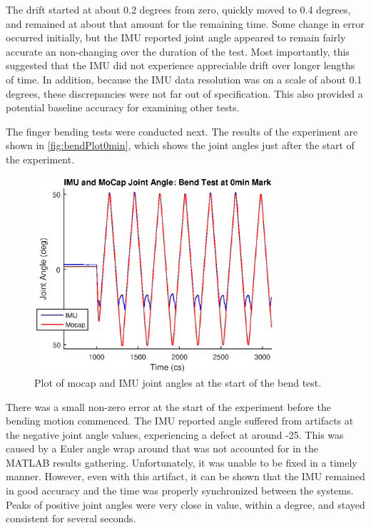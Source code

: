 \documentclass[letterpaper, 10 pt, conference]{ieeeconf}  %
\begin{document}
The drift started at about 0.2 degrees from zero, quickly moved to 0.4 degrees, and remained at about that amount for the remaining time. Some change in error occurred initially, but the IMU reported joint angle appeared to remain fairly accurate an non-changing over the duration of the test. Most importantly, this suggested that the IMU did not experience appreciable drift over longer lengths of time. In addition, because the IMU data resolution was on a scale of about 0.1 degrees, these discrepancies were not far out of specification. This also provided a potential baseline accuracy for examining other tests. 

The finger bending tests were conducted next. The results of the experiment are shown in \autoref{fig:bendPlot0min}, which shows the joint angles just after the start of the experiment.

\begin{figure}[thpb]
	\centering
	\includegraphics[width = 3.5in]{finger_bend_imuANDmocap_0min.eps}
    \caption{Plot of mocap and IMU joint angles at the start of the bend test.}
    \label{fig:bendPlot0min}
\end{figure}

There was a small non-zero error at the start of the experiment before the bending motion commenced. The IMU reported angle suffered from artifacts at the negative joint angle values, experiencing a defect at around -25\degree. This was caused by a Euler angle wrap around that was not accounted for in the MATLAB results gathering. Unfortunately, it was unable to be fixed in a timely manner. However, even with this artifact, it can be shown that the IMU remained in good accuracy and the time was properly synchronized between the systems. Peaks of positive joint angles were very close in value, within a degree, and stayed consistent for several seconds. 
\end{document}
